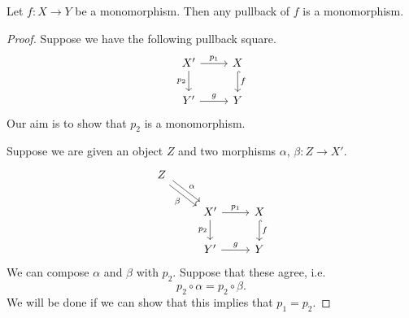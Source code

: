 \documentclass[main.tex]{subfiles}
\begin{document}
\begin{lemma}
  Let $f\colon X \to Y$ be a monomorphism. Then any pullback of $f$ is a monomorphism.
\end{lemma}
\begin{proof}
  Suppose we have the following pullback square.
  \begin{equation*}
    \begin{tikzcd}
      X'
      \arrow[r, "p_{1}"]
      \arrow[d, swap, "p_{2}"]
      & X
      \arrow[d, hookrightarrow, "f"]
      \\
      Y'
      \arrow[r, "g"]
      & Y
    \end{tikzcd}
  \end{equation*}
  Our aim is to show that $p_{2}$ is a monomorphism.

  Suppose we are given an object $Z$ and two morphisms $\alpha$, $\beta\colon Z \to X'$.
  \begin{equation*}
    \begin{tikzcd}
      Z
      \arrow[dr, shift left, "\alpha"]
      \arrow[dr, shift right, swap, "\beta"]
      \\
      & X'
      \arrow[r, "p_{1}"]
      \arrow[d, swap, "p_{2}"]
      & X
      \arrow[d, hookrightarrow, "f"]
      \\
      & Y'
      \arrow[r, "g"]
      & Y
    \end{tikzcd}
  \end{equation*}
  We can compose $\alpha$ and $\beta$ with $p_{2}$. Suppose that these agree, i.e.
  \begin{equation*}
    p_{2} \circ \alpha = p_{2} \circ \beta.
  \end{equation*}
  We will be done if we can show that this implies that $p_{1} = p_{2}$.


\end{proof}
\end{document}
